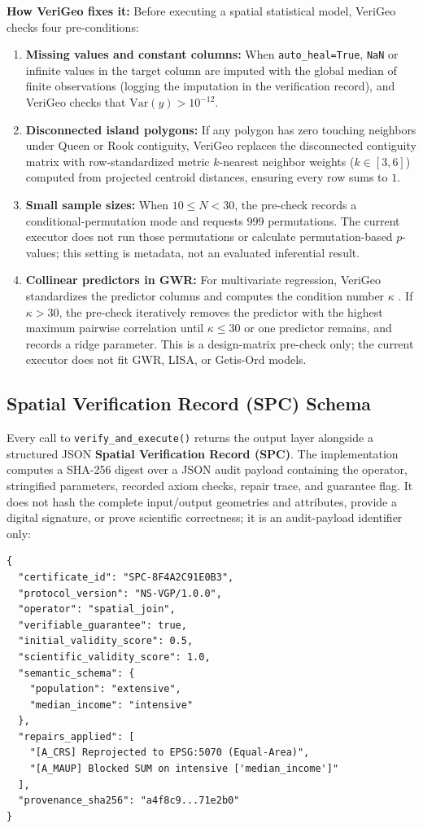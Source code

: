 \documentclass[10pt,twocolumn]{article}
\begin{document}
\textbf{How VeriGeo fixes it:} Before executing a spatial statistical model, VeriGeo checks four pre-conditions:
\begin{enumerate}
  \item \textbf{Missing values and constant columns:} When \texttt{auto\_heal=True}, \texttt{NaN} or infinite values in the target column are imputed with the global median of finite observations (logging the imputation in the verification record), and VeriGeo checks that $\text{Var}(y) > 10^{-12}$.
  \item \textbf{Disconnected island polygons:} If any polygon has zero touching neighbors under Queen or Rook contiguity, VeriGeo replaces the disconnected contiguity matrix with row-standardized metric $k$-nearest neighbor weights ($k \in [3, 6]$) computed from projected centroid distances, ensuring every row sums to $1$.
  \item \textbf{Small sample sizes:} When $10 \le N < 30$, the pre-check records a conditional-permutation mode and requests $999$ permutations. The current executor does not run those permutations or calculate permutation-based $p$-values; this setting is metadata, not an evaluated inferential result.
  \item \textbf{Collinear predictors in GWR:} For multivariate regression, VeriGeo standardizes the predictor columns and computes the condition number $\kappa$ \cite{belsley1980regression}. If $\kappa > 30$, the pre-check iteratively removes the predictor with the highest maximum pairwise correlation until $\kappa \le 30$ or one predictor remains, and records a ridge parameter. This is a design-matrix pre-check only; the current executor does not fit GWR, LISA, or Getis-Ord models.
\end{enumerate}

\subsection{Spatial Verification Record (SPC) Schema}
Every call to \texttt{verify\_and\_execute()} returns the output layer alongside a structured JSON \textbf{Spatial Verification Record (SPC)}. The implementation computes a SHA-256 digest over a JSON audit payload containing the operator, stringified parameters, recorded axiom checks, repair trace, and guarantee flag. It does not hash the complete input/output geometries and attributes, provide a digital signature, or prove scientific correctness; it is an audit-payload identifier only:
\begin{footnotesize}
\begin{verbatim}
{
  "certificate_id": "SPC-8F4A2C91E0B3",
  "protocol_version": "NS-VGP/1.0.0",
  "operator": "spatial_join",
  "verifiable_guarantee": true,
  "initial_validity_score": 0.5,
  "scientific_validity_score": 1.0,
  "semantic_schema": {
    "population": "extensive",
    "median_income": "intensive"
  },
  "repairs_applied": [
    "[A_CRS] Reprojected to EPSG:5070 (Equal-Area)",
    "[A_MAUP] Blocked SUM on intensive ['median_income']"
  ],
  "provenance_sha256": "a4f8c9...71e2b0"
}
\end{verbatim}
\end{footnotesize}
\end{document}
